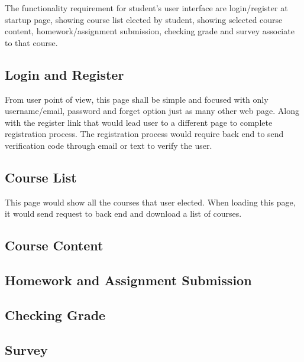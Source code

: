 The functionality requirement for student's user interface are login/register at startup page, showing course list elected by student, showing selected course content, homework/assignment submission, checking grade and survey associate to that course.

\subsection{Login and Register}
From user point of view, this page shall be simple and focused with only username/email, password and forget option just as many other web page. Along with the register link that would lead user to a different page to complete registration process. The registration process would require back end to send verification code through email or text to verify the user. 

\subsection{Course List}
This page would show all the courses that user elected. When loading this page, it would send request to back end and download a list of courses.

\subsection{Course Content}

\subsection{Homework and Assignment Submission}

\subsection{Checking Grade}

\subsection{Survey}